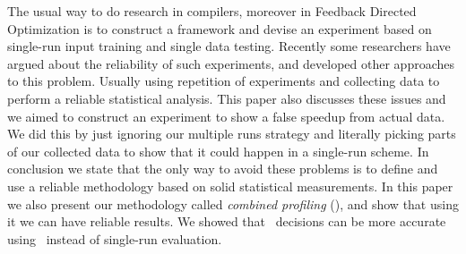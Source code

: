 
The usual way to do research in compilers, moreover in Feedback Directed Optimization is to construct a framework and devise an experiment based on single-run input training and single data testing. Recently some researchers have argued about the reliability of such experiments, and developed other approaches to this problem. Usually using repetition of experiments and collecting data to perform a reliable statistical analysis. This paper also discusses these issues and we aimed to construct an experiment to show a false speedup from actual data. We did this by just ignoring our multiple runs strategy and literally picking parts of our collected data to show that it could happen in a single-run scheme. In conclusion we state that the only way to avoid these problems is to define and use a reliable methodology based on solid statistical measurements. In this paper we also present our methodology called {\em combined profiling} (\CP), and show that using it we can have reliable results. We showed that \FDI\ decisions can be more accurate using \CP\ instead of single-run evaluation.
